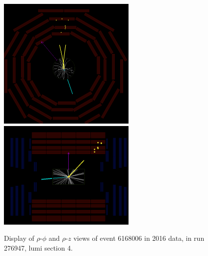 \begin{figure}[htpb]
  \centering
  \includegraphics[width=0.6\textwidth]{figures/displaced/event-276947_6168006_4_RhoPhi.png}
  \includegraphics[width=0.6\textwidth]{figures/displaced/event-276947_6168006_4_RhoZ.png}
  \caption{Display of $\rho$-$\phi$ and $\rho$-$z$ views of event 6168006 in 2016 data, in run 276947, lumi section 4.}
  \label{fig:dd:event-4}
\end{figure}

